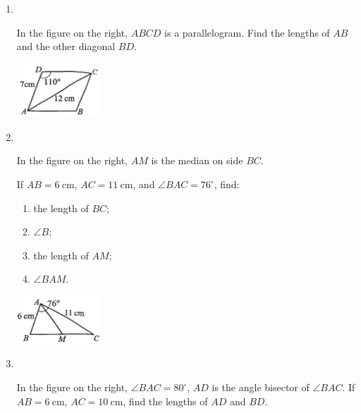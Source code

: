 \documentclass{report}
\begin{document}
\begin{enumerate}
        \item \parbox[t]{0.9\textwidth}{
            ~
            \vspace{-1.1em}
            \begin{vwcol}[widths={0.7,0.3}, sep=8mm, rule=0pt]
                In the figure on the right, $ABCD$ is a parallelogram. Find the lengths of $AB$ and the other diagonal $BD$.
    
                \includegraphics[width=0.25\textwidth]{assets/10-31.jpg}
            \end{vwcol}
        }

        \vspace{3em}
        \item \parbox[t]{0.9\textwidth}{
            ~
            \vspace{-1.1em}
            \begin{vwcol}[widths={0.7,0.3}, sep=8mm, rule=0pt]
                In the figure on the right, $AM$ is the median on side $BC$.

                \noindent If $AB = 6 \mathrm{~cm}$, $AC = 11 \mathrm{~cm}$, and $\angle BAC = 76^\circ$, find:
                
                \noindent\parbox{0.5\textwidth}{
                    \begin{enumerate}
                        \item the length of $BC$;
                        \item $\angle B$;
                        \item the length of $AM$;
                        \item $\angle BAM$.
                    \end{enumerate}}
    
                \includegraphics[width=0.25\textwidth]{assets/10-32.jpg}
            \end{vwcol}
        }

    \vspace{-3em}
    \item \parbox[t]{0.9\textwidth}{
        ~
        \vspace{-1.1em}
        \begin{vwcol}[widths={0.7,0.3}, sep=8mm, rule=0pt]
            In the figure on the right, $\angle BAC = 80^\circ$, $AD$ is the angle bisector of $\angle BAC$. If $AB = 6 \mathrm{~cm}$, $AC = 10 \mathrm{~cm}$, find the lengths of $AD$ and $BD$.
    

\end{vwcol}}
\end{enumerate}
\end{document}
